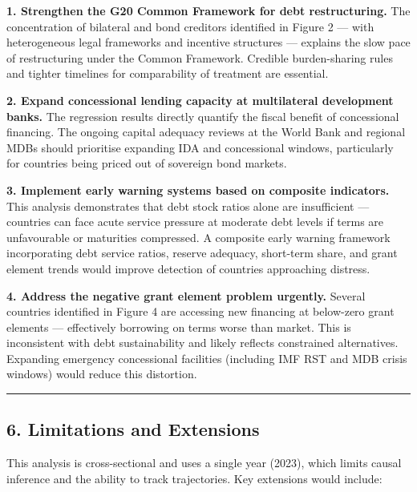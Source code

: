 \documentclass[
  letterpaper,
  DIV=11,
  numbers=noendperiod]{scrartcl}
\begin{document}
\textbf{1. Strengthen the G20 Common Framework for debt restructuring.}
The concentration of bilateral and bond creditors identified in Figure 2
--- with heterogeneous legal frameworks and incentive structures ---
explains the slow pace of restructuring under the Common Framework.
Credible burden-sharing rules and tighter timelines for comparability of
treatment are essential.

\textbf{2. Expand concessional lending capacity at multilateral
development banks.} The regression results directly quantify the fiscal
benefit of concessional financing. The ongoing capital adequacy reviews
at the World Bank and regional MDBs should prioritise expanding IDA and
concessional windows, particularly for countries being priced out of
sovereign bond markets.

\textbf{3. Implement early warning systems based on composite
indicators.} This analysis demonstrates that debt stock ratios alone are
insufficient --- countries can face acute service pressure at moderate
debt levels if terms are unfavourable or maturities compressed. A
composite early warning framework incorporating debt service ratios,
reserve adequacy, short-term share, and grant element trends would
improve detection of countries approaching distress.

\textbf{4. Address the negative grant element problem urgently.} Several
countries identified in Figure 4 are accessing new financing at
below-zero grant elements --- effectively borrowing on terms worse than
market. This is inconsistent with debt sustainability and likely
reflects constrained alternatives. Expanding emergency concessional
facilities (including IMF RST and MDB crisis windows) would reduce this
distortion.

\begin{center}\rule{0.5\linewidth}{0.5pt}\end{center}

\subsection{6. Limitations and
Extensions}\label{limitations-and-extensions}

This analysis is cross-sectional and uses a single year (2023), which
limits causal inference and the ability to track trajectories. Key
extensions would include:
\end{document}
